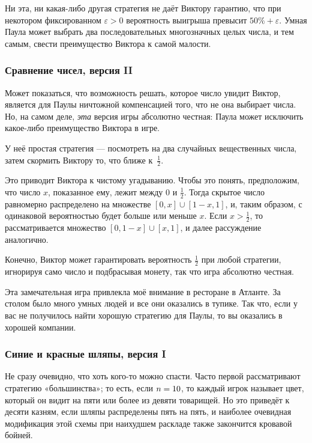 Ни эта, ни какая-либо другая стратегия не даёт Виктору гарантию, что при некотором фиксированном $\varepsilon>0$ вероятность выигрыша превысит $50\%+\varepsilon$.
Умная Паула может выбрать два последовательных многозначных целых числа, и тем самым, свести преимущество Виктора к самой малости.

\subsubsection*{Сравнение чисел, версия II}%

Может показаться, что возможность решать, которое число увидит Виктор, является для Паулы ничтожной компенсацией того, что не она выбирает числа.
Но, на самом деле, \emph{эта} версия игры абсолютно честная:
Паула может исключить какое-либо преимущество Виктора в игре.

У неё простая стратегия --- посмотреть на два случайных вещественных числа, затем скормить Виктору то, что ближе к~$\tfrac12$.

Это приводит Виктора к чистому угадыванию.
Чтобы это понять, предположим, что число $x$, показанное ему, лежит между $0$ и $\tfrac12$.
Тогда скрытое число равномерно распределено на множестве $[0,x]\cup [1-x, 1]$, и, таким образом, с одинаковой вероятностью будет больше или меньше $x$.
Если $x>\tfrac12$, то рассматривается множество $[0, 1-x]\cup [x, 1]$, и далее рассуждение аналогично.

Конечно, Виктор может гарантировать вероятность $\tfrac12$ при любой стратегии, игнорируя само число и подбрасывая монету, так что игра абсолютно честная.
\heart

Эта замечательная игра привлекла моё внимание в ресторане в Атланте.
За столом было много умных людей и все они оказались в тупике.
Так что, если у вас не получилось найти хорошую стратегию для Паулы, то вы оказались в хорошей компании.

\subsubsection*{Синие и красные шляпы, версия I}%

Не сразу очевидно, что хоть кого-то можно спасти.
Часто первой рассматривают стратегию «большинства»;
то есть, если $n\z=10$, то каждый игрок называет цвет, который он видит на пяти или более из девяти товарищей.
Но это приведёт к десяти казням, если шляпы распределены пять на пять, и наиболее очевидная модификация этой схемы при наихудшем раскладе также закончится кровавой бойней.

